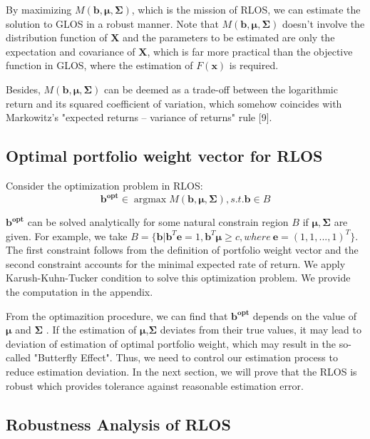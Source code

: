 \documentclass{gapd}
\begin{document}
By maximizing $M(\mathbf{b},\boldsymbol{\mu},\boldsymbol{\Sigma})$, which is the mission of RLOS, we can estimate the solution to GLOS in a robust manner. Note that $M(\mathbf{b},\boldsymbol{\mu},\boldsymbol{\Sigma})$ doesn't involve the distribution function of $\textbf{X}$ and the parameters to be estimated are only the expectation and covariance of $\textbf{X}$, which is far more practical than the objective function in GLOS, where the estimation of $F(\textbf{x})$ is required.

Besides, $M(\mathbf{b},\boldsymbol{\mu},\boldsymbol{\Sigma})$ can be deemed as a trade-off between the logarithmic return and its squared coefficient of variation, which somehow coincides with Markowitz's "expected returns – variance of returns" rule [9].

\subsection{Optimal portfolio weight vector for RLOS}

Consider the optimization problem in RLOS:
$$\mathbf{b^{opt}}\in \mathop{\arg\max} M(\mathbf{b},\boldsymbol{\mu},\boldsymbol{\Sigma}), s.t. \mathbf{b}\in B$$

$\mathbf{b^{opt}}$ can be solved analytically for some natural constrain region $𝐵$ if $\boldsymbol{\mu},\boldsymbol{\Sigma}$ are given. For example, we take $B=\{\mathbf{b}|\mathbf{b}^T\mathbf{e}=1,\mathbf{b}^T\boldsymbol{\mu} \ge c, where\ \mathbf{e}=(1,1,...,1)^T\}$. The first constraint follows from the definition of portfolio weight vector and the second constraint accounts for the minimal expected rate of return. We apply Karush-Kuhn-Tucker condition to solve this optimization problem. We provide the computation in the appendix.

From the optimazition procedure, we can find that $\mathbf{b^{opt}}$ depends on the value of $\boldsymbol{\mu}$ and $\boldsymbol{\Sigma}$ . If the estimation of $\boldsymbol{\mu}$,$\boldsymbol{\Sigma}$ deviates from their true values, it may lead to deviation of estimation of optimal portfolio weight, which may result in the so-called "Butterfly Effect". Thus, we need to control our estimation process to reduce estimation deviation. In the next section, we will prove that the RLOS is robust which provides tolerance against reasonable estimation error.

\subsection{Robustness Analysis of RLOS}
\end{document}
